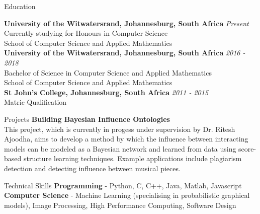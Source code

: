 \documentclass{resume} %
\begin{document}

\begin{rSection}{Education}

{\bf University of the Witwatersrand, Johannesburg, South Africa} \hfill {\em Present} 
\\ Currently studying for Honours in Computer Science
\\ School of Computer Science and Applied Mathematics\\
{\bf University of the Witwatersrand, Johannesburg, South Africa} \hfill {\em 2016 - 2018} 
\\ Bachelor of Science in Computer Science and Applied Mathematics
\\ School of Computer Science and Applied Mathematics\\
{\bf St John's College, Johannesburg, South Africa} \hfill {\em 2011 - 2015} 
\\ Matric Qualification


\end{rSection}

\begin{rSection}{Projects}
{\bf Building Bayesian Influence Ontologies}
\\This project, which is currently in progess under supervision by Dr. Ritesh Ajoodha, aims to develop a method by which the influence between interacting models can be modeled as a Bayesian network and learned from data using score-based structure learning techniques. Example applications include plagiarism detection and detecting influence between musical pieces.\\

\end{rSection}

\begin{rSection}{Technical Skills}
\textbf{Programming} - Python, C, C++, Java, Matlab, Javascript
\\
\textbf{Computer Science} - Machine Learning (specialising in probabilistic graphical models), Image Processing, High Performance Computing, Software Design
\end{rSection}
\end{document}
